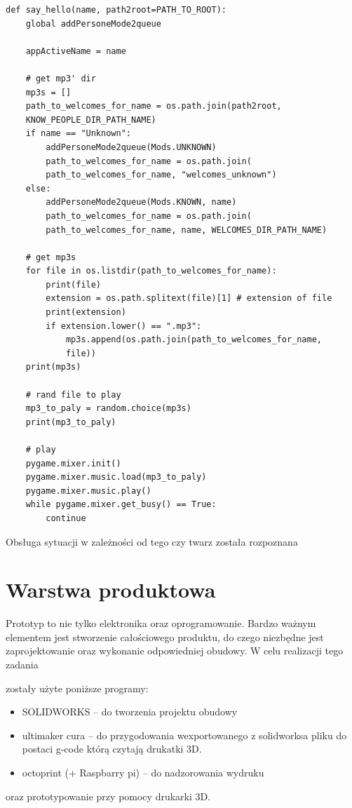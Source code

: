 \documentclass[a4paper,12pt,reqno]{article}
\begin{document}
\begin{listing}[H]%
\begin{mdframed}[backgroundcolor=codebg]
\begin{verbatim}
def say_hello(name, path2root=PATH_TO_ROOT):
    global addPersoneMode2queue
    
    appActiveName = name
    
    # get mp3' dir
    mp3s = []
    path_to_welcomes_for_name = os.path.join(path2root, 
    KNOW_PEOPLE_DIR_PATH_NAME)
    if name == "Unknown":
        addPersoneMode2queue(Mods.UNKNOWN)
        path_to_welcomes_for_name = os.path.join(
        path_to_welcomes_for_name, "welcomes_unknown")
    else:
        addPersoneMode2queue(Mods.KNOWN, name)
        path_to_welcomes_for_name = os.path.join(
        path_to_welcomes_for_name, name, WELCOMES_DIR_PATH_NAME)
        
    # get mp3s
    for file in os.listdir(path_to_welcomes_for_name):
        print(file)
        extension = os.path.splitext(file)[1] # extension of file
        print(extension)
        if extension.lower() == ".mp3":
            mp3s.append(os.path.join(path_to_welcomes_for_name, 
            file))
    print(mp3s)        
        
    # rand file to play
    mp3_to_paly = random.choice(mp3s)
    print(mp3_to_paly)
    
    # play      
    pygame.mixer.init()
    pygame.mixer.music.load(mp3_to_paly)
    pygame.mixer.music.play()
    while pygame.mixer.get_busy() == True:
        continue
\end{verbatim}
\end{mdframed}
\caption{Obsługa sytuacji w zależności od tego czy twarz została rozpoznana}
\label{listing:py1}
\end{listing}

\newpage
\section{Warstwa produktowa} \label{section:warstwa_produkcyjna} %
Prototyp to nie tylko elektronika oraz oprogramowanie. Bardzo ważnym elementem jest stworzenie całościowego produktu, do czego niezbędne jest zaprojektowanie oraz wykonanie odpowiedniej obudowy. W celu realizacji tego zadania \textcolor{new}{zostały użyte poniższe programy:
\begin{itemize}
\item SOLIDWORKS – do tworzenia projektu obudowy
\item ultimaker cura – do przygodowania wexportowanego z solidworksa pliku do postaci g-code którą czytają drukatki 3D.
\item octoprint (+ Raspbarry pi) – do nadzorowania wydruku
\end{itemize}}
oraz prototypowanie przy pomocy drukarki 3D.
\end{document}
